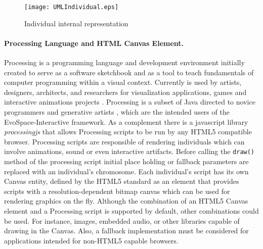 \documentclass{llncs}
\begin{document}

\begin{figure}[t]
    \centering
        \texttt{[image: UMLIndividual.eps]}
    \caption{Individual internal representation }
    \label{fig:individual}
\end{figure}

\paragraph{Processing Language and HTML Canvas Element.}
Processing is a programming language and development environment initially created to serve as a software sketchbook and as a tool to teach fundamentals
of computer programming within a visual context.
Currently is used by artists, designers, architects, and researchers for visualization applications, games and interactive animations projects \cite{Reas:2007wp}.
Processing is a subset of Java directed to novice programmers and generative artists \cite{Pearson:2011ti}, which are the intended users of the EvoSpace-Interactive framework.
As a complement there is a javascript library \emph{processingjs} that allows Processing scripts to be run by any HTML5 compatible browser.
Processing scripts are responsible of rendering individuals which can involve animations, sound or even interactive artifacts.
Before calling the \texttt{draw()} method of the processing script initial place holding or fallback parameters are replaced with an individual's chromosome.
Each individual's script has its own Canvas entity, defined by the HTML5 standard as an element that provides scripts with a resolution-dependent bitmap canvas
which can be used for rendering graphics on the fly.
Although the combination of an HTML5 Canvas element and a Processing script is supported by default, other combinations could be used.
For instance, images, embedded audio, or other libraries capable of drawing in the Canvas.
Also, a fallback implementation must be considered for applications intended for non-HTML5 capable browsers.
\end{document}
